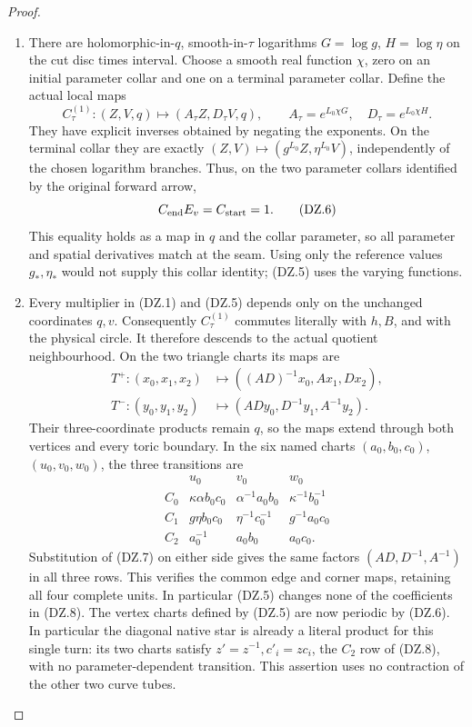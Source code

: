 \begin{proof}
\begin{enumerate}[label=\arabic*.]
\item There are holomorphic-in-\(q\), smooth-in-\(\tau\) logarithms
\(G=\log g\), \(H=\log\eta\) on the cut disc times interval. Choose a
smooth real function \(\chi\), zero on an initial parameter collar and
one on a terminal parameter collar. Define the actual local maps
\[
 C^{(1)}_\tau:(Z,V,q)\longmapsto
       (A_\tau Z,D_\tau V,q),\qquad
 A_\tau=e^{L_0\chi G},\quad D_\tau=e^{L_0\chi H}.    \tag{DZ.5}
\]
They have explicit inverses obtained by negating the exponents.
On the terminal collar they are exactly
\((Z,V)\mapsto(g^{L_0}Z,\eta^{L_0}V)\), independently of the chosen logarithm
branches. Thus, on the two parameter collars identified by the
original forward arrow,
\[
                     C_{\rm end}E_v=C_{\rm start}=1. \tag{DZ.6}
\]
This equality holds as a map in \(q\) and the collar parameter, so
all parameter and spatial derivatives match at the seam. Using only
the reference values \(g_*,\eta_*\) would not supply this collar
identity; (DZ.5) uses the varying functions.

\item Every multiplier in (DZ.1) and (DZ.5) depends only on the unchanged
coordinates \(q,v\). Consequently \(C^{(1)}_\tau\) commutes literally
with \(h,B\), and with the physical circle. It therefore descends
to the actual quotient neighbourhood. On the two triangle charts its
maps are
\[
 \begin{split}
 T^+:(x_0,x_1,x_2)&\longmapsto
       ((AD)^{-1}x_0,Ax_1,Dx_2),\\
 T^-:(y_0,y_1,y_2)&\longmapsto
       (ADy_0,D^{-1}y_1,A^{-1}y_2).
 \end{split}                                          \tag{DZ.7}
\]
Their three-coordinate products remain \(q\), so the maps extend
through both vertices and every toric boundary. In the six named
charts \((a_0,b_0,c_0)\), \((u_0,v_0,w_0)\), the three transitions are
\[
 \begin{array}{c|ccc}
 &u_0&v_0&w_0\\ \hline
 C_0&\kappa\alpha b_0c_0&\alpha^{-1}a_0b_0&
                                      \kappa^{-1}b_0^{-1}\\
 C_1&g\eta b_0c_0&\eta^{-1}c_0^{-1}&g^{-1}a_0c_0\\
 C_2&a_0^{-1}&a_0b_0&a_0c_0 .
 \end{array}                                          \tag{DZ.8}
\]
Substitution of (DZ.7) on either side gives the same factors
\((AD,D^{-1},A^{-1})\) in all three rows. This verifies the common
edge and corner maps, retaining all four complete units. In
particular (DZ.5) changes none of the coefficients in (DZ.8).
The vertex charts defined by (DZ.5) are now periodic by (DZ.6).
In particular the diagonal native star is already a literal product
for this single turn: its two charts satisfy
\(z'=z^{-1},c'_i=zc_i\), the \(C_2\) row of (DZ.8), with no
parameter-dependent transition. This assertion uses no
contraction of the other two curve tubes.


\end{enumerate}
\end{proof}
